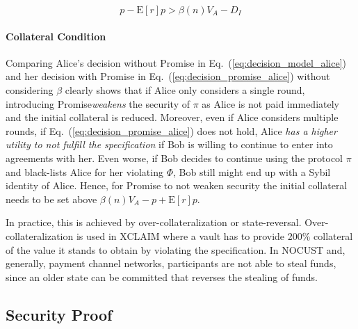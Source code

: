 \documentclass[runningheads]{llncs}
\newcommand{\sys}{Promise\xspace}
\begin{document}
\begin{equation}
\label{eq:decision_promise_alice}
    p - \mathrm{E}[r]p > \beta(n) V_A - D_I
\end{equation}

\paragraph{Collateral Condition}
Comparing Alice's decision without \sys in Eq.~(\ref{eq:decision_model_alice}) and her decision with \sys in Eq.~(\ref{eq:decision_promise_alice}) without considering $\beta$ clearly shows that if Alice only considers a single round, introducing \sys \emph{weakens} the security of $\pi$ as Alice is not paid immediately and the initial collateral is reduced.
Moreover, even if Alice considers multiple rounds, if Eq.~(\ref{eq:decision_promise_alice}) does not hold, Alice \emph{has a higher utility to not fulfill the specification} if Bob is willing to continue to enter into agreements with her.
Even worse, if Bob decides to continue using the protocol $\pi$ and black-lists Alice for her violating $\Phi$, Bob still might end up with a Sybil identity of Alice.
Hence, for \sys to not weaken security the initial collateral needs to be set above $\beta(n)V_A-p+\mathrm{E}[r]p$.

In practice, this is achieved by over-collateralization or state-reversal.
Over-collateralization is used in XCLAIM where a vault has to provide 200\% collateral of the value it stands to obtain by violating the specification.
In NOCUST and, generally, payment channel networks, participants are not able to steal funds, since an older state can be committed that reverses the stealing of funds.


\subsection{Security Proof}

\end{document}
